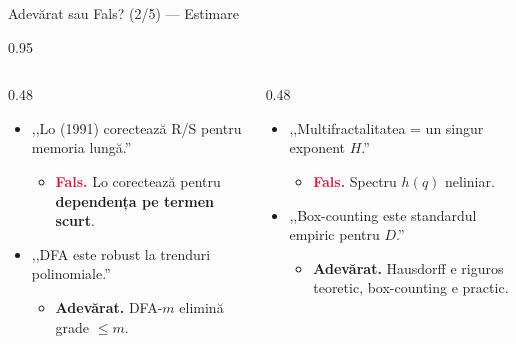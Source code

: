 \documentclass[9pt, aspectratio=169, t]{beamer}
\begin{document}
\begin{frame}[shrink=15]{Adevărat sau Fals? (2/5) --- Estimare}
\begin{cminipage}{0.95\textwidth}
\begin{columns}[T]
\begin{column}{0.48\textwidth}
\begin{itemize}\setlength{\itemsep}{2pt}
    \item ,,Lo (1991) corectează R/S pentru memoria lungă.''
    \begin{itemize}\setlength{\itemsep}{0pt}
        \item[] \textcolor{Crimson}{\textbf{Fals.}} Lo corectează pentru \textbf{dependența pe termen scurt}.
    \end{itemize}
    \item ,,DFA este robust la trenduri polinomiale.''
    \begin{itemize}\setlength{\itemsep}{0pt}
        \item[] \textcolor{Forest}{\textbf{Adevărat.}} DFA-$m$ elimină grade $\leq m$.
    \end{itemize}
\end{itemize}
\end{column}
\begin{column}{0.48\textwidth}
\begin{itemize}\setlength{\itemsep}{2pt}
    \item ,,Multifractalitatea = un singur exponent $H$.''
    \begin{itemize}\setlength{\itemsep}{0pt}
        \item[] \textcolor{Crimson}{\textbf{Fals.}} Spectru $h(q)$ neliniar.
    \end{itemize}
    \item ,,Box-counting este standardul empiric pentru $D$.''
    \begin{itemize}\setlength{\itemsep}{0pt}
        \item[] \textcolor{Forest}{\textbf{Adevărat.}} Hausdorff e riguros teoretic, box-counting e practic.
    \end{itemize}
\end{itemize}
\end{column}
\end{columns}
\end{cminipage}
\end{frame}
\end{document}

